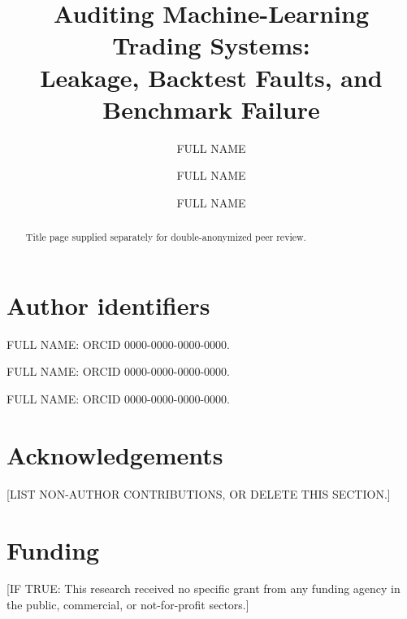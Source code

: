 \documentclass[preprint,12pt,authoryear]{elsarticle}
\begin{document}
\begin{frontmatter}

\title{Auditing Machine-Learning Trading Systems:\\
       Leakage, Backtest Faults, and Benchmark Failure}

\author[1]{FULL NAME}
\author[1]{FULL NAME}
\author[2]{FULL NAME}




\begin{abstract}
Title page supplied separately for double-anonymized peer review.
\end{abstract}

\end{frontmatter}

\section*{Author identifiers}

FULL NAME: ORCID 0000-0000-0000-0000.\par
FULL NAME: ORCID 0000-0000-0000-0000.\par
FULL NAME: ORCID 0000-0000-0000-0000.

\section*{Acknowledgements}

[LIST NON-AUTHOR CONTRIBUTIONS, OR DELETE THIS SECTION.]

\section*{Funding}

[IF TRUE: This research received no specific grant from any funding agency in
the public, commercial, or not-for-profit sectors.]\par
[OTHERWISE: NAME THE FUNDER, GRANT NUMBER, RECIPIENT, AND FUNDER'S ROLE.]
\end{document}

